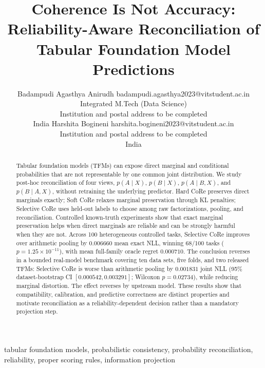 \documentclass[twoside,11pt]{article}
\begin{document}
\title{Coherence Is Not Accuracy: Reliability-Aware Reconciliation of Tabular Foundation Model Predictions}

\author{\name Badampudi Agasthya Anirudh \email badampudi.agasthya2023@vitstudent.ac.in \\
       \addr Integrated M.Tech (Data Science)\\
       Institution and postal address to be completed\\
       India
       \AND
       \name Harshita Bogineni \email harshita.bogineni2023@vitstudent.ac.in \\
       \addr Institution and postal address to be completed\\
       India}

\maketitle

\begin{abstract}
Tabular foundation models (TFMs) can expose direct marginal and conditional probabilities that are not representable by one common joint distribution. We study post-hoc reconciliation of four views, $p(A\mid X)$, $p(B\mid X)$, $p(A\mid B,X)$, and $p(B\mid A,X)$, without retraining the underlying predictor. Hard CoRe preserves direct marginals exactly; Soft CoRe relaxes marginal preservation through KL penalties; Selective CoRe uses held-out labels to choose among raw factorizations, pooling, and reconciliation. Controlled known-truth experiments show that exact marginal preservation helps when direct marginals are reliable and can be strongly harmful when they are not. Across 100 heterogeneous controlled tasks, Selective CoRe improves over arithmetic pooling by $0.006660$ mean exact NLL, winning 68/100 tasks ($p=1.25\times10^{-11}$), with mean full-family oracle regret $0.000710$. The conclusion reverses in a bounded real-model benchmark covering ten data sets, five folds, and two released TFMs: Selective CoRe is worse than arithmetic pooling by $0.001831$ joint NLL (95\% dataset-bootstrap CI $[0.000542,0.003291]$; Wilcoxon $p=0.02734$), while reducing marginal distortion. The effect reverses by upstream model. These results show that compatibility, calibration, and predictive correctness are distinct properties and motivate reconciliation as a reliability-dependent decision rather than a mandatory projection step.
\end{abstract}

\begin{keywords}
tabular foundation models, probabilistic consistency, probability reconciliation, reliability, proper scoring rules, information projection
\end{keywords}
\end{document}
